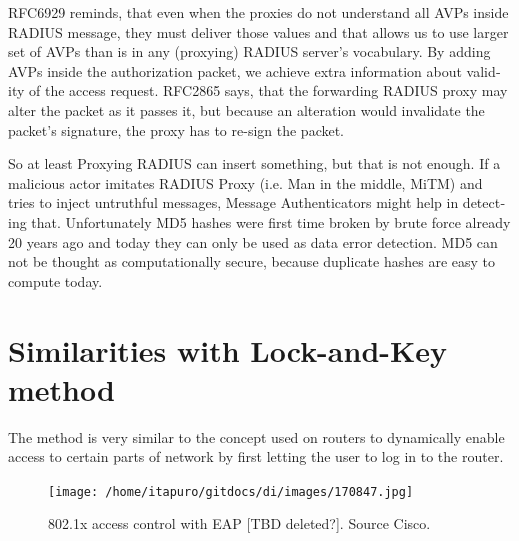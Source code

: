 \documentclass[12pt,a4paper,english]{tutthesis}
\begin{document}
\begin{otherlanguage}{english}
RFC6929\cite{rfc6929} reminds, that even when
the proxies do not understand all AVPs inside RADIUS message, they
must deliver those values and that allows us to use larger set of AVPs 
than is in any (proxying) RADIUS server's vocabulary.
By adding AVPs inside the authorization packet, we achieve extra
information about validity of the access request.
RFC2865\cite{rfc2865} says, that the forwarding RADIUS proxy may alter
the packet as it passes it, but because an alteration would invalidate the
packet's signature, the proxy has to re-sign the packet.




So at least Proxying RADIUS can insert something, but that is not enough.
If a malicious actor imitates RADIUS Proxy (i.e. Man in the
middle, MiTM) and tries to inject untruthful messages, Message Authenticators might help in detecting
that. Unfortunately MD5 hashes were first time broken by brute force
already 20 years ago and today they can only be used as data error
detection\cite[p.2]{rfc6151}. MD5 can not be thought as
computationally secure, because duplicate hashes are easy to compute today\cite{xie2013fast}. 





\section{Similarities with Lock-and-Key method}
\label{sec-4-8}
The method is very similar to the concept used on routers to dynamically enable
access to certain parts of network by first letting the user to log in
to the router.


\begin{figure}[htb]
\centering
\texttt{[image: /home/itapuro/gitdocs/di/images/170847.jpg]}
\caption{\label{fig:cisco-802.1x}802.1x access control with EAP [TBD deleted?]. Source Cisco.}
\end{figure}







\end{otherlanguage}
\end{document}
